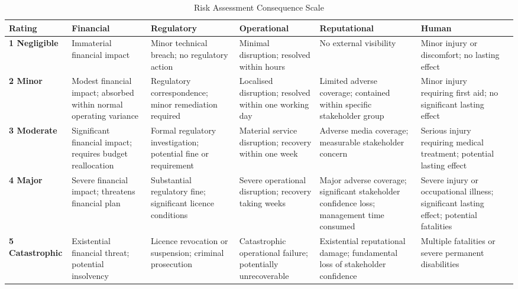 \begin{table}[H]
  \centering
  \renewcommand{\arraystretch}{1.5}
  \begin{tabularx}{\textwidth}{ | >{\raggedright\arraybackslash}p{} 
								| >{\raggedright\arraybackslash}p{} 
								| >{\raggedright\arraybackslash}p{} 
								| >{\raggedright\arraybackslash}p{} 
								| >{\raggedright\arraybackslash}p{} 
								| >{\raggedright\arraybackslash}p{} 
                                | >{\raggedright\arraybackslash}X | }
    \hline
    \textbf{Rating} & \textbf{Financial} & \textbf{Regulatory} & \textbf{Operational} & \textbf{Reputational} & \textbf{Human} \\
    \hline
    \textbf{1 Negligible} & Immaterial financial impact & Minor technical breach; no regulatory action & Minimal disruption; resolved within hours & No external visibility & Minor injury or discomfort; no lasting effect\\
    \hline
    \textbf{2 Minor} & Modest financial impact; absorbed within normal operating variance & Regulatory correspondence; minor remediation required & Localised disruption; resolved within one working day & Limited adverse coverage; contained within specific stakeholder group & Minor injury requiring first aid; no significant lasting effect\\
    \hline
    \textbf{3 Moderate} & Significant financial impact; requires budget reallocation & Formal regulatory investigation; potential fine or requirement & Material service disruption; recovery within one week & Adverse media coverage; measurable stakeholder concern & Serious injury requiring medical treatment; potential lasting effect\\
    \hline
    \textbf{4 Major} & Severe financial impact; threatens financial plan & Substantial regulatory fine; significant licence conditions & Severe operational disruption; recovery taking weeks & Major adverse coverage; significant stakeholder confidence loss; management time consumed & Severe injury or occupational illness; significant lasting effect; potential fatalities\\
    \hline
    \textbf{5 Catastrophic} & Existential financial threat; potential insolvency & Licence revocation or suspension; criminal prosecution & Catastrophic operational failure; potentially unrecoverable & Existential reputational damage; fundamental loss of stakeholder confidence & Multiple fatalities or severe permanent disabilities\\
    \hline
  \end{tabularx}
  \caption{Risk Assessment Consequence Scale}
\end{table}

